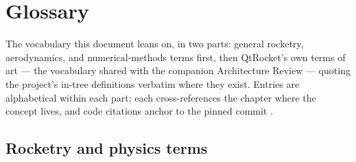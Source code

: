 \section{Glossary}\label{app:glossary}

The vocabulary this document leans on, in two parts: general rocketry, aerodynamics, and
numerical-methods terms first, then QtRocket's own terms of art --- the vocabulary shared
with the companion Architecture Review --- quoting the project's in-tree definitions
verbatim where they exist. Entries are alphabetical within each part; each cross-references
the chapter where the concept lives, and code citations anchor to the pinned commit
.

\subsection{Rocketry and physics terms}\label{app:glossary-physics}

